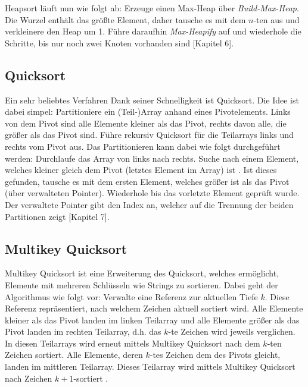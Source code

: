 Heapsort läuft nun wie folgt ab: Erzeuge einen Max-Heap über \textit{Build-Max-Heap}. Die Wurzel enthält das größte Element, daher tausche es mit dem $n$-ten aus und verkleinere den Heap um 1. Führe daraufhin \textit{Max-Heapify} auf und wiederhole die Schritte, bis nur noch zwei Knoten vorhanden sind \cite{Cormen2009}[Kapitel 6].

\subsection{Quicksort}
Ein sehr beliebtes Verfahren Dank seiner Schnelligkeit ist Quicksort. Die Idee ist dabei simpel: Partitioniere ein (Teil-)Array anhand eines Pivotelements. Links von dem Pivot sind alle Elemente kleiner als das Pivot, rechts davon alle, die größer als das Pivot sind. Führe rekursiv Quicksort für die Teilarrays links und rechts vom Pivot aus. Das Partitionieren kann dabei wie folgt durchgeführt werden: Durchlaufe das Array von links nach rechts. Suche nach einem Element, welches kleiner gleich dem Pivot (letztes Element im Array) ist . Ist dieses gefunden, tausche es mit dem ersten Element, welches größer ist als das Pivot (über verwalteten Pointer). Wiederhole bis das vorletzte Element geprüft wurde. Der verwaltete Pointer gibt den Index an, welcher auf die Trennung der beiden Partitionen zeigt \cite{Cormen2009}[Kapitel 7].

\subsection{Multikey Quicksort}
Multikey Quicksort ist eine Erweiterung des Quicksort, welches ermöglicht, Elemente mit mehreren Schlüsseln wie Strings zu sortieren. Dabei geht der Algorithmus wie folgt vor: Verwalte eine Referenz zur aktuellen Tiefe $k$. Diese Referenz repräsentiert, nach welchem Zeichen aktuell sortiert wird. Alle Elemente kleiner als das Pivot landen im linken Teilarray und alle Elemente größer als das Pivot landen im rechten Teilarray, d.h. das $k$-te Zeichen wird jeweils verglichen. In diesen Teilarrays wird erneut mittels Multikey Quicksort nach dem $k$-ten Zeichen sortiert. Alle Elemente, deren $k$-tes Zeichen dem des Pivots gleicht, landen im mittleren Teilarray. Dieses Teilarray wird mittels Multikey Quicksort nach Zeichen $k+1$-sortiert \cite{bese97}. 

